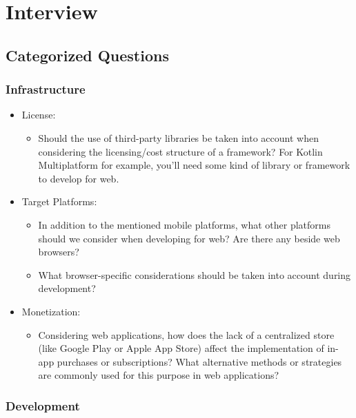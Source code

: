\chapter{Interview}
\section{Categorized Questions}

\subsection{Infrastructure}

\begin{itemize}
  \item License: 
    \begin{itemize}
      \item Should the use of third-party libraries be taken into account when considering the licensing/cost structure of a framework? For Kotlin Multiplatform for example, you'll need some kind of library or framework to develop for web.
    \end{itemize}
  \item Target Platforms:
    \begin{itemize}
      \item In addition to the mentioned mobile platforms, what other platforms should we consider when developing for web? Are there any beside web browsers? 
      \item What browser-specific considerations should be taken into account during development?
    \end{itemize}
  \item Monetization:
    \begin{itemize}
      \item Considering web applications, how does the lack of a centralized store (like Google Play or Apple App Store) affect the implementation of in-app purchases or subscriptions? What alternative methods or strategies are commonly used for this purpose in web applications?
    \end{itemize}
\end{itemize}

\subsection{Development}

